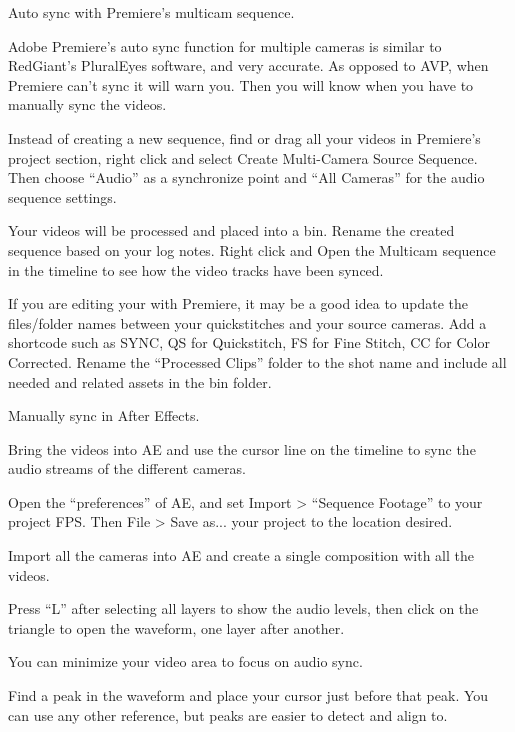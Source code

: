\begin{fullwidth}
{\large Auto sync with Premiere’s multicam sequence. \par}

Adobe Premiere’s auto sync function for multiple cameras is similar to RedGiant’s PluralEyes software, and very accurate. As opposed to AVP, when Premiere can’t sync it will warn you. Then you will know when you have to manually sync the videos.


Instead of creating a new sequence, find or drag all your videos in Premiere’s project section, right click and select Create Multi-Camera Source Sequence. Then choose “Audio” as a synchronize point and “All Cameras” for the audio sequence settings.



Your videos will be processed and placed into a bin. Rename the created sequence based on your log notes. Right click and Open the Multicam sequence in the timeline to see how the video tracks have been synced.


If you are editing your \textbf{} with Premiere, it may be a good idea to update the files/folder names between your quickstitches and your source cameras. Add a shortcode such as SYNC, QS for Quickstitch, FS for Fine Stitch, CC for Color Corrected. Rename the “Processed Clips” folder to the shot name and include all needed and related assets in the bin folder.

\clearpage
{\large Manually sync in After Effects. \par}

Bring the videos into AE and use the cursor line on the timeline to sync the audio streams of the different cameras.

Open the “preferences” of AE, and set Import > “Sequence Footage” to your project FPS. Then File > Save as... your project to the location desired.

Import all the cameras into AE and create a single composition with all the videos.

Press “L” after selecting all layers to show the audio levels, then click on the triangle to open the waveform, one layer after another. 


You can minimize your video area to focus on audio sync.

Find a peak in the waveform and place your cursor just before that peak. You can use any other reference, but peaks are easier to detect and align to.


\end{fullwidth}
